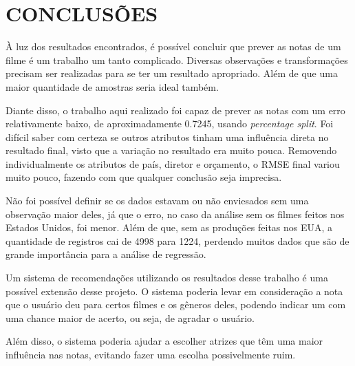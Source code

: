 \section{CONCLUSÕES}
À luz dos resultados encontrados, é possível concluir que prever as notas de um filme é um trabalho um tanto complicado. Diversas observações e transformações precisam ser realizadas para se ter um resultado apropriado. Além de que uma maior quantidade de amostras seria ideal também.

Diante disso, o trabalho aqui realizado foi capaz de prever as notas com um erro relativamente baixo, de aproximadamente 0.7245, usando \textit{percentage split}. Foi difícil saber com certeza se outros atributos tinham uma influência direta no resultado final, visto que a variação no resultado era muito pouca. Removendo individualmente os atributos de país, diretor e orçamento, o RMSE final variou muito pouco, fazendo com que qualquer conclusão seja imprecisa.

Não foi possível definir se os dados estavam ou não enviesados sem uma observação maior deles, já que o erro, no caso da análise sem os filmes feitos nos Estados Unidos, foi menor. Além de que, sem as produções feitas nos EUA, a quantidade de registros cai de 4998 para 1224, perdendo muitos dados que são de grande importância para a análise de regressão.

Um sistema de recomendações utilizando os resultados desse trabalho é uma possível extensão desse projeto. O sistema poderia levar em consideração a nota que o usuário deu para certos filmes e os gêneros deles, podendo indicar um com uma chance maior de acerto, ou seja, de agradar o usuário.

Além disso, o sistema poderia ajudar a escolher atrizes que têm uma maior influência nas notas, evitando fazer uma escolha possivelmente ruim.